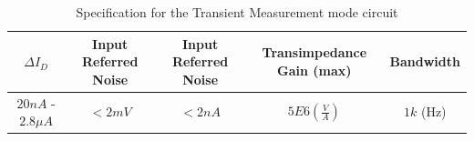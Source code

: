 \begin{table}[!htbp]
    {\fontfamily{}\fontsize{10}{14}\selectfont
    \centering
    \begin{tabular}{c|c|c|c|c}
        $\Delta I_D$&Input Referred Noise&Input Referred Noise&Transimpedance Gain (max)&Bandwidth\\
        \hline
        $20n A$ - $2.8\mu A$&$< 2m V$& $< 2n A$&$5E6(\frac{V}{A})$&$1k$ (Hz)\\
    \end{tabular}
    \caption{Specification for the Transient Measurement mode circuit}
    \label{tb:ACSpec}
    }
\end{table}





 

